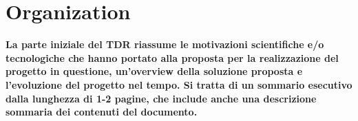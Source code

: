 \section{Organization}
\label{sec:Organization}

{\bf \color{red} La parte iniziale del TDR riassume le motivazioni scientifiche e/o tecnologiche che hanno portato alla proposta per la realizzazione del progetto in questione, un’overview della soluzione proposta e l’evoluzione del progetto nel tempo. Si tratta di un sommario esecutivo dalla lunghezza di 1-2 pagine, che include anche una descrizione sommaria dei contenuti del documento.}
